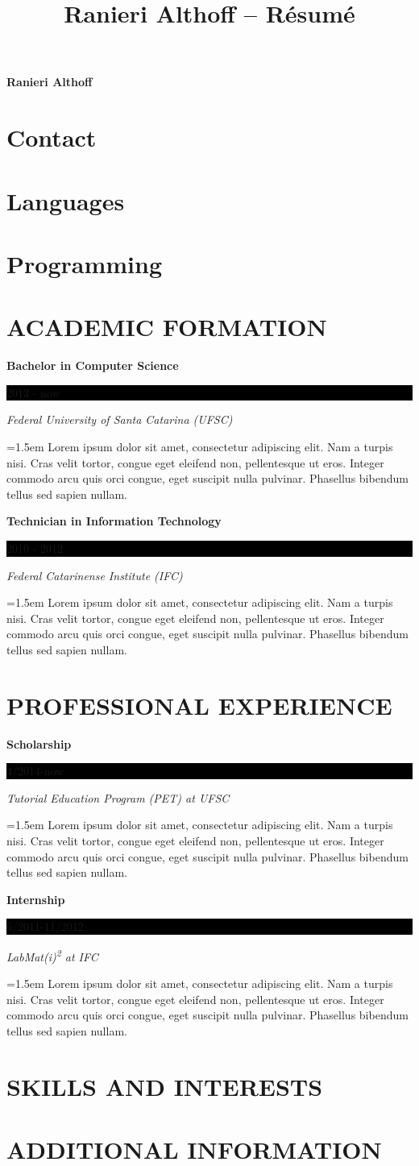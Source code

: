 \documentclass{article}
\newcommand{\sectiontitle}[1]{\section*{\uppercase{#1}}}
\newcommand{\formationentry}[4]{
	\noindent \textbf{#1} \hfill
	\colorbox{black}{
		\parbox[c][1em]{8em}{
			\hfill \color{white} #2
		}
	} \par
	\noindent \textit{#3} \par
	\noindent \hangindent=1.5em \hangafter=0 \small #4 \par
	\normalsize
	\vspace{1em}
}
\newcommand{\experienceentry}[4]{
	\noindent \textbf{#1} \hfill
	\colorbox{black}{
		\parbox[c][1em]{8em}{
			\hfill \color{white} #2
		}
	} \par
	\noindent \textit{#3} \par
	\noindent \hangindent=1.5em \hangafter=0 \small #4 \par
	\normalsize
	\vspace{1em}
}
\newenvironment{aside}{
\begin{minipage}[t]{0.3\textwidth}
}{
\end{minipage}
}
\newenvironment{main}{
\begin{minipage}[t]{0.7\textwidth}
}{
\end{minipage}
}
\begin{document}
 \selectfont

\title{Ranieri Althoff -- Résumé}

\Huge \hfill \textbf{Ranieri Althoff}
\normalsize \par
{}

\begin{aside}
\section*{Contact}


\section*{Languages}


\section*{Programming}


\end{aside}
\hspace{1em} \vrule \hspace{1em}
\begin{main}
\sectiontitle{Academic Formation}
\formationentry{Bachelor in Computer Science}{2013 - now}{Federal University
of Santa Catarina (UFSC)}{Lorem ipsum dolor sit amet, consectetur adipiscing
elit. Nam a turpis nisi. Cras velit tortor, congue eget eleifend non,
pellentesque ut eros.  Integer commodo arcu quis orci congue, eget suscipit
nulla pulvinar. Phasellus bibendum tellus sed sapien nullam.}

\formationentry{Technician in Information Technology}{2010 - 2012}{Federal
Catarinense Institute (IFC)}{Lorem ipsum dolor sit amet, consectetur adipiscing
elit. Nam a turpis nisi. Cras velit tortor, congue eget eleifend non,
pellentesque ut eros.  Integer commodo arcu quis orci congue, eget suscipit
nulla pulvinar. Phasellus bibendum tellus sed sapien nullam.}


\sectiontitle{Professional Experience}
\experienceentry{Scholarship}{4/2014-now}{Tutorial Education Program (PET) at
UFSC}{Lorem ipsum dolor sit amet, consectetur adipiscing elit. Nam a turpis
nisi. Cras velit tortor, congue eget eleifend non, pellentesque ut eros.
Integer commodo arcu quis orci congue, eget suscipit nulla pulvinar.
Phasellus bibendum tellus sed sapien nullam.}

\experienceentry{Internship}{6/2011-11/2012}{LabMat(i)\textsuperscript{2} at
IFC}{Lorem ipsum dolor sit amet, consectetur adipiscing elit. Nam a turpis
nisi. Cras velit tortor, congue eget eleifend non, pellentesque ut eros.
Integer commodo arcu quis orci congue, eget suscipit nulla pulvinar.
Phasellus bibendum tellus sed sapien nullam.}


\sectiontitle{Skills and Interests}


\sectiontitle{Additional Information}


\end{main}
\end{document}
